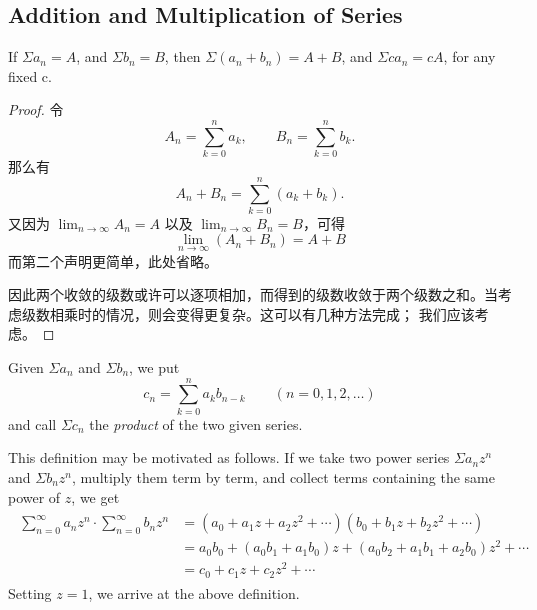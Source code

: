 \documentclass[../poma-notes.tex]{subfiles}
\begin{document}
\subsection*{Addition and Multiplication of Series}

\begin{theorem}
  If $\Sigma a_n = A$, and $\Sigma b_n = B$, then $\Sigma(a_n + b_n) = A + B$, and $\Sigma c a_n = c A$,
  for any fixed c.
\end{theorem}

\begin{proof}
  令
  \[
    A_n = \sum_{k=0}^{n} a_k, \qquad B_n = \sum_{k=0}^{n} b_k.
  \]
  那么有
  \[
    A_n + B_n = \sum_{k=0}^{n}(a_k + b_k).
  \]
  又因为 $\lim_{n\to\infty} A_n = A$ 以及 $\lim_{n\to\infty} B_n = B$，可得
  \[
    \lim_{n\to\infty} (A_n + B_n) = A + B
  \]
  而第二个声明更简单，此处省略。

  因此两个收敛的级数或许可以逐项相加，而得到的级数收敛于两个级数之和。当考虑级数相乘时的情况，则会变得更复杂。这可以有几种方法完成；
  我们应该考虑。
\end{proof}

\begin{definition}
  Given $\Sigma a_n$ and $\Sigma b_n$, we put
  \[
    c_n = \sum_{k=0}^{n} a_k b_{n-k} \qquad (n=0,1,2,\dots)
  \]
  and call $\Sigma c_n$ the \textit{product} of the two given series.

  This definition may be motivated as follows. If we take two power series $\Sigma a_n z^n$ and $\Sigma b_n z^n$,
  multiply them term by term, and collect terms containing the same power of $z$, we get
  \begin{align*}
    \begin{split}
      \sum_{n=0}^{\infty} a_n z^n \cdot \sum_{n=0}^{\infty} b_n z^n & = (a_0+a_1z+a_2z^2+\cdots)(b_0+b_1z+b_2z^2+\cdots) \\
      & = a_0b_0 + (a_0b_1 + a_1b_0)z + (a_0b_2+a_1b_1+a_2b_0)z^2 + \cdots \\
      & = c_0 + c_1z + c_2z^2 + \cdots
    \end{split}
  \end{align*}
  Setting $z=1$, we arrive at the above definition.
\end{definition}
\end{document}

